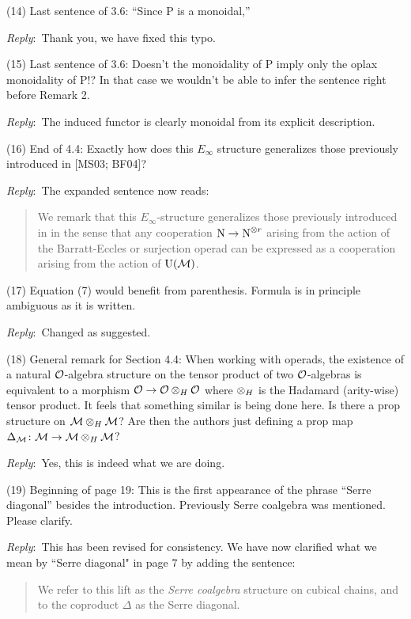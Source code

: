 \documentclass{amsart}
\newcommand{\ar}{\medskip\noindent\textit{Reply}:\ }
\newcommand{\rp}{\medskip\noindent}
\begin{document}
	\rp (14) Last sentence of 3.6: “Since P is a monoidal,”

	\ar Thank you, we have fixed this typo.

	\rp (15) Last sentence of 3.6: Doesn’t the monoidality of P imply only the oplax monoidality of P!? In that case we wouldn’t be able to infer the sentence right before Remark 2.

	\ar The induced functor is clearly monoidal from its explicit description.

	\rp (16) End of 4.4: Exactly how does this $E_\infty$ structure generalizes those previously introduced in [MS03; BF04]?

	\ar The expanded sentence now reads:

	\begin{quote}
		We remark that this $E_\infty$-structure generalizes those previously introduced in \cite{mcclure2003multivariable,berger2004combinatorial} in the sense that any cooperation $\operatorname{N} \to \operatorname{N}^{\otimes r}$ arising from the action of the Barratt-Eccles or surjection operad can be expressed as a cooperation arising from the action of ${\operatorname{U}(\mathcal{M})}$.
	\end{quote}

	\rp (17) Equation (7) would benefit from parenthesis. Formula is in principle ambiguous as it is written.

	\ar Changed as suggested.

	\rp (18) General remark for Section 4.4: When working with operads, the existence of a natural $\mathcal{O}$-algebra structure on the tensor product of two $\mathcal{O}$-algebras is equivalent to a morphism $\mathcal{O} \to \mathcal{O} \otimes_H \mathcal{O}$ where $\otimes_H$ is the Hadamard (arity-wise) tensor product.
	It feels that something similar is being done here.
	Is there a prop structure on $\mathcal{M} \otimes_H \mathcal{M}$? Are then the authors just defining a prop map $\Delta_{\mathcal{M}} \colon \mathcal{M} \to \mathcal{M} \otimes_H \mathcal{M}$?

	\ar Yes, this is indeed what we are doing.

	\rp (19) Beginning of page 19: This is the first appearance of the phrase “Serre diagonal” besides the introduction.
	Previously Serre coalgebra was mentioned.
	Please clarify.

	\ar This has been revised for consistency. We have now clarified what we mean by ``Serre diagonal" in page 7 by adding the sentence:
    \begin{quote}
        We refer to this lift as the \textit{Serre coalgebra} structure on cubical chains, and to the coproduct $\Delta$ as the Serre diagonal.
    \end{quote}
\end{document}
